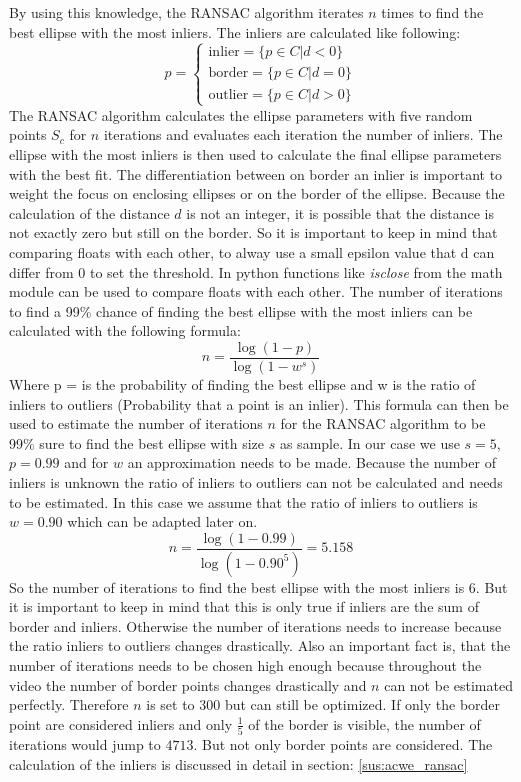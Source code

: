 By using this knowledge, the RANSAC algorithm iterates $n$ times to find the best ellipse with the most inliers. The inliers are calculated like following: 
\begin{equation}
    p =\begin{cases}
    \text{inlier} = \{p \in C | d < 0\}\\
    \text{border} = \{p \in C | d = 0\}\\
    \text{outlier} = \{p \in C | d > 0\}
    \end{cases}
    \label{inliers}
\end{equation}
The RANSAC algorithm calculates the ellipse parameters with five random points $S_c$ for $n$ iterations and evaluates each iteration the number of inliers. The ellipse with the most inliers is then used to calculate the final ellipse parameters with the best fit. 
The differentiation between on border an inlier is important to weight the focus on enclosing ellipses or on the border of the ellipse. Because the calculation of the distance $d$ is not an integer, it is possible that the distance is not exactly zero but still on the border. So it is important to keep in mind that comparing floats with each other, to alway use a small epsilon value that d can differ from 0 to set the threshold. 
In python functions like \textit{isclose} from the math module can be used to compare floats with each other. The number of iterations to find a 99\% chance of finding the best ellipse with the most inliers can be calculated with the following formula: 
\begin{equation}
    n = \frac{\log(1-p)}{\log(1-w^s)}
    \label{iterations}
\end{equation}
Where p = is the probability of finding the best ellipse and w is the ratio of inliers to outliers (Probability that a point is an inlier). This formula can then be used to estimate the number of iterations $n$ for the RANSAC algorithm to be 99\% sure to find the best ellipse with size $s$ as sample. In our case we use $s=5$, $p=0.99$ and for $w$ an approximation needs to be made. Because the number of inliers is unknown the ratio of inliers to outliers can not be calculated and needs to be estimated. In this case we assume that the ratio of inliers to outliers is $w=0.90$ which can be adapted later on. 
\begin{equation}
    n = \frac{\log(1-0.99)}{\log(1-0.90^5)} =  5.158
\end{equation}
So the number of iterations to find the best ellipse with the most inliers is 6. But it is important to keep in mind that this is only true if inliers are the sum of border and inliers. Otherwise the number of iterations needs to increase because the ratio inliers to outliers changes drastically. Also an important fact is, that the number of iterations needs to be chosen high enough because throughout the video the number of border points changes drastically and $n$ can not be estimated perfectly. Therefore $n$ is set to $300$ but can still be optimized. If only the border point are considered inliers and only $\frac{1}{5}$ of the border is visible, the number of iterations would jump to $4713$. But not only border points are considered. The calculation of the inliers is discussed in detail in section: \ref{sus:acwe_ransac}
